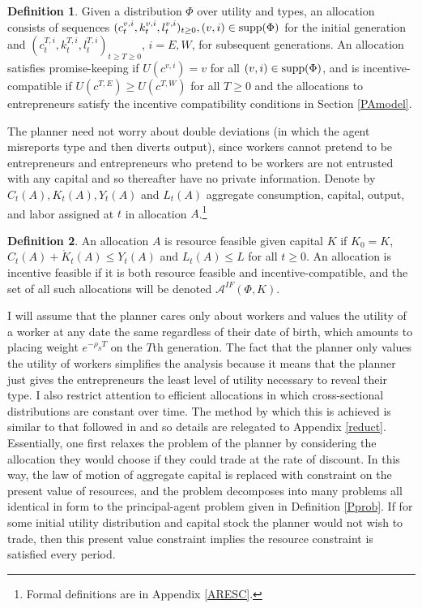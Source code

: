 \documentclass[11pt]{article}
\theoremstyle{plain}
\theoremstyle{definition} %
\newtheorem{defn}{Definition}[section]
\begin{document}
\begin{defn} \label{defnALLOCgen}
Given a distribution $\Phi$ over utility and types, an allocation consists of sequences $(c^{v,i}_t,k^{v,i}_t,l^{v,i}_t)_{t\geq 0}, (v,i) \in \textnormal{supp}(\Phi)$ for the initial generation and $(c^{T,i}_t, k^{T,i}_t,l^{T,i}_t)_{t\geq T \geq 0}$, $i = E,W$, for subsequent generations. An allocation satisfies promise-keeping if $U(c^{v,i}) = v$ for all $(v, i) \in \textnormal{supp}(\Phi)$, and is incentive-compatible if $U(c^{T,E}) \geq U(c^{T,W})$ for all $T \geq 0$ and the allocations to entrepreneurs satisfy the incentive compatibility conditions in Section \ref{PAmodel}.
\end{defn}

The planner need not worry about double deviations (in which the agent misreports type and then diverts output), since workers cannot pretend to be entrepreneurs and entrepreneurs who pretend to be workers are not entrusted with any capital and so thereafter have no private information. Denote by $C_t(A), K_t(A), Y_t(A)$ and $L_t(A)$ aggregate consumption, capital, output, and labor assigned at $t$ in allocation $A$.\footnote{Formal definitions are in Appendix \ref{ARESC}.} 

\begin{defn}
An allocation $A$ is resource feasible given capital $K$ if $K_0 = K$, $C_t(A) + \dot{K}_t(A) \leq Y_t(A)$ and $L_t(A) \leq L$ for all $t \geq 0$. An allocation is incentive feasible if it is both resource feasible and incentive-compatible, and the set of all such allocations will be denoted $\mathcal{A}^{IF}(\Phi,K)$.
\end{defn} 

I will assume that the planner cares only about workers and values the utility of a worker at any date the same regardless of their date of birth, which amounts to placing weight $e^{-\rho_ST}$ on the $T$th generation. The fact that the planner only values the utility of workers simplifies the analysis because it means that the planner just gives the entrepreneurs the least level of utility necessary to reveal their type. I also restrict attention to efficient allocations in which cross-sectional distributions are constant over time. The method by which this is achieved is similar to that followed in \cite{farhi_inequality_2007} and so details are relegated to Appendix \ref{reduct}. Essentially, one first relaxes the problem of the planner by considering the allocation they would choose if they could trade at the rate of discount. In this way, the law of motion of aggregate capital is replaced with constraint on the present value of resources, and the problem decomposes into many problems all identical in form to the principal-agent problem given in Definition \ref{Pprob}. If for some initial utility distribution and capital stock the planner would not wish to trade, then this present value constraint implies the resource constraint is satisfied every period.
\end{document}
